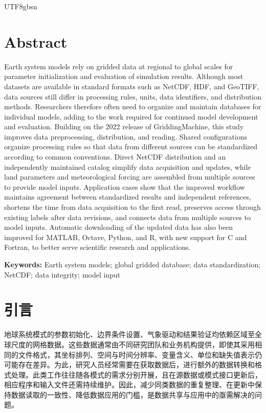 \documentclass[numdoi]{chinese}
\begin{document}
\begin{CJK}{UTF8}{gbsn}
\section*{Abstract}
Earth system models rely on gridded data at regional to global scales for parameter initialization and evaluation of simulation results. Although most datasets are available in standard formats such as NetCDF, HDF, and GeoTIFF, data sources still differ in processing rules, units, data identifiers, and distribution methods. Researchers therefore often need to organize and maintain databases for individual models, adding to the work required for continued model development and evaluation. Building on the 2022 release of GriddingMachine, this study improves data preprocessing, distribution, and reading. Shared configurations organize processing rules so that data from different sources can be standardized according to common conventions. Direct NetCDF distribution and an independently maintained catalog simplify data acquisition and updates, while land parameters and meteorological forcing are assembled from multiple sources to provide model inputs. Application cases show that the improved workflow maintains agreement between standardized results and independent references, shortens the time from data acquisition to the first read, preserves access through existing labels after data revisions, and connects data from multiple sources to model inputs. Automatic downloading of the updated data has also been improved for MATLAB, Octave, Python, and R, with new support for C and Fortran, to better serve scientific research and applications.

\textbf{Keywords:} Earth system models; global gridded database; data standardization; NetCDF; data integrity; model input




\clearpage
\section{引言}
地球系统模式的参数初始化、边界条件设置、气象驱动和结果验证均依赖区域至全球尺度的网格数据。这些数据通常由不同研究团队和业务机构提供，即使其采用相同的文件格式，其坐标排列、空间与时间分辨率、变量含义、单位和缺失值表示仍可能存在差异。为此，研究人员经常需要在获取数据后，进行额外的数据转换和格式处理。此类工作往往随各模式的需求分别开展，且在源数据或模式接口更新后，相应程序和输入文件还需持续维护。因此，减少同类数据的重复整理、在更新中保持数据读取的一致性、降低数据应用的门槛，是数据共享与应用中的亟需解决的问题。


\end{CJK}
\end{document}
